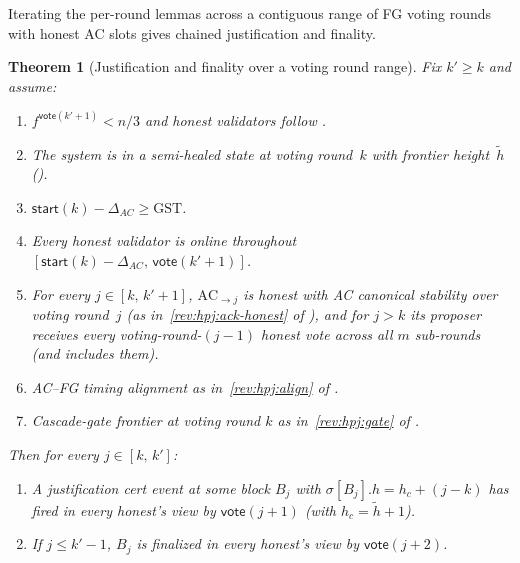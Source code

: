 \ifx\litemode\undefined\documentclass{article}\fi
\newcommand{\start}{\ensuremath{\mathsf{start}}}
\newcommand{\vote}{\ensuremath{\mathsf{vote}}}
\newcommand{\GST}{\ensuremath{\mathrm{GST}}\xspace}
\newcommand{\comm}[1]{\ensuremath{\widetilde{#1}}}
\theoremstyle{plain}
\newtheorem{theorem}{Theorem}
\theoremstyle{definition}
\theoremstyle{remark}
\begin{document}
Iterating the per-round lemmas across a contiguous range of FG voting rounds with honest AC slots gives chained justification and finality.

\begin{theorem}[Justification and finality over a voting round range]\label{thm:on-chain-range}
Fix $k' \geq k$ and assume:
\begin{enumerate}
  \item $f^{\vote(k'+1)} < n/3$ and honest validators follow .
  \item The system is in a semi-healed state at voting round~$k$ with frontier height~$\comm{h}$ ().
  \item $\start(k) - \Delta_{\mathit{AC}} \geq \GST$.
  \item Every honest validator is online throughout $[\start(k) - \Delta_{\mathit{AC}},\, \vote(k'+1)]$.
  \item\label{rev:thm:ac-chain} For every $j \in [k,\, k'+1]$, $\mathrm{AC}_{\to j}$ is honest with AC canonical stability over voting round~$j$ (as in~\ref{rev:hpj:ack-honest} of ), and for $j > k$ its proposer receives every voting-round-$(j-1)$ honest vote across all $m$ sub-rounds (and includes them).
  \item AC--FG timing alignment as in~\ref{rev:hpj:align} of .
  \item Cascade-gate frontier at voting round $k$ as in~\ref{rev:hpj:gate} of .
\end{enumerate}

Then for every $j \in [k,\, k']$:
\begin{enumerate}
  \item[\textnormal{(T1)}] A justification cert event at some block $B_j$ with $\sigma[B_j].h = h_c + (j - k)$ has fired in every honest's view by $\vote(j+1)$ (with $h_c = \comm{h} + 1$).
  \item[\textnormal{(T2)}] If $j \leq k' - 1$, $B_j$ is finalized in every honest's view by $\vote(j+2)$.
\end{enumerate}
\end{theorem}
\end{document}
